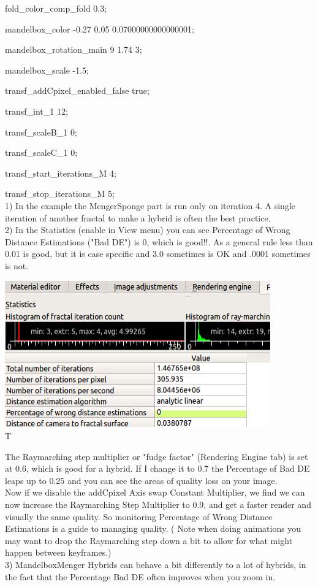 fold\_color\_comp\_fold 0.3;

mandelbox\_color -0.27 0.05 0.07000000000000001;

mandelbox\_rotation\_main 9 1.74 3;

mandelbox\_scale -1.5;

transf\_addCpixel\_enabled\_false true;

transf\_int\_1 12;

transf\_scaleB\_1 0;

transf\_scaleC\_1 0;

transf\_start\_iterations\_M 4;

transf\_stop\_iterations\_M 5;\\[2\baselineskip]1) In the example the
MengerSponge part is run only on iteration 4. A single iteration of another
fractal to make a hybrid is often the best practice.\\[2\baselineskip]2) In the
Statistics (enable in View menu) you can see Percentage of Wrong Distance
Estimations ("Bad DE") is 0, which is good!!. As a general rule less than 0.01
is good, but it is case specific and 3.0 sometimes is OK and .0001 sometimes is
not.

\includegraphics[width=4.51024in,height=2.48976in]{img/manual/media/image31.png}\\[2\baselineskip]T

The Raymarching step multiplier or "fudge factor" (Rendering Engine tab) is set
at 0.6, which is good for a hybrid. If I change it to 0.7 the Percentage of Bad
DE leaps up to 0.25 and you can see the areas of quality loss on your
image.\\[2\baselineskip]Now if we disable the addCpixel Axis swap Constant
Multiplier, we find we can now increase the Raymarching Step Multiplier to 0.9,
and get a faster render and visually the same quality. So monitoring Percentage
of Wrong Distance Estimations is a guide to managing quality. ( Note when doing
animations you may want to drop the Raymarching step down a bit to allow for
what might happen between keyframes.)\\[2\baselineskip]3) MandelboxMenger
Hybrids can behave a bit differently to a lot of hybrids, in the fact that the
Percentage Bad DE often improves when you zoom in.

